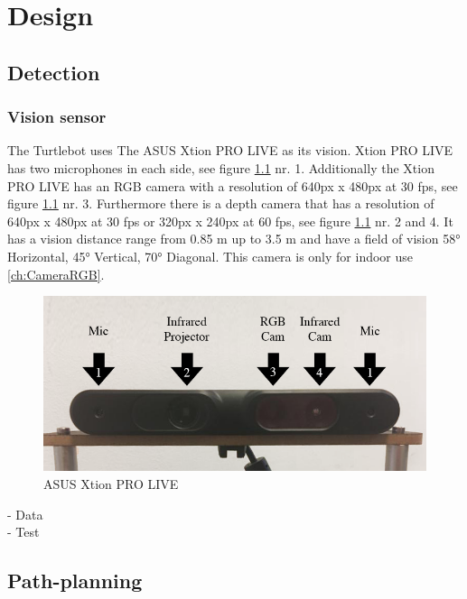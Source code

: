 \chapter{Design}
\label{ch:design}

%
%
%
%
\section{Detection}

\subsection{Vision sensor} %
The Turtlebot uses The ASUS Xtion PRO LIVE as its vision. Xtion PRO LIVE has two microphones in each side, see figure \ref{fig:asusCamera} nr. 1. Additionally the Xtion PRO LIVE has an RGB camera with a resolution of 640px x 480px at 30 fps, see figure \ref{fig:asusCamera} nr. 3. Furthermore there is a depth camera that has a resolution of 640px x 480px at 30 fps or 320px x 240px at 60 fps, see figure \ref{fig:asusCamera} nr. 2 and 4.
It has a vision distance range from 0.85 m up to 3.5 m and have a field of vision 58° Horizontal, 45° Vertical, 70° Diagonal.
This camera is only for indoor use \ref{ch:CameraRGB}.
\begin{figure}[h]
    \centering
    \includegraphics[width=\textwidth]{figures/camera02.png}
    \caption{ASUS Xtion PRO LIVE} 
    \label{fig:asusCamera} 
\end{figure}


- Data\\
- Test\\

%
%
%
%
\section{Path-planning}

